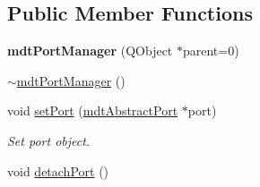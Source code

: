 \subsection*{Public Member Functions}
\begin{DoxyCompactItemize}
\item 
\hypertarget{classmdt_port_manager_a5ec36523089b7528d973e29cdbc64d01}{
{\bfseries mdtPortManager} (QObject $\ast$parent=0)}
\label{classmdt_port_manager_a5ec36523089b7528d973e29cdbc64d01}

\item 
\hyperlink{classmdt_port_manager_adf797f8fd7a3ffdc000890a224e4c1b6}{$\sim$mdtPortManager} ()
\item 
void \hyperlink{classmdt_port_manager_afcd156b2d0c9d340999935efb6cd8cb6}{setPort} (\hyperlink{classmdt_abstract_port}{mdtAbstractPort} $\ast$port)
\begin{DoxyCompactList}\small\item\em Set port object. \end{DoxyCompactList}\item 
\hypertarget{classmdt_port_manager_a608210f908d6ac53ced36f5cf9a783f9}{
void \hyperlink{classmdt_port_manager_a608210f908d6ac53ced36f5cf9a783f9}{detachPort} ()}
\label{classmdt_port_manager_a608210f908d6ac53ced36f5cf9a783f9}


\end{DoxyCompactItemize}
